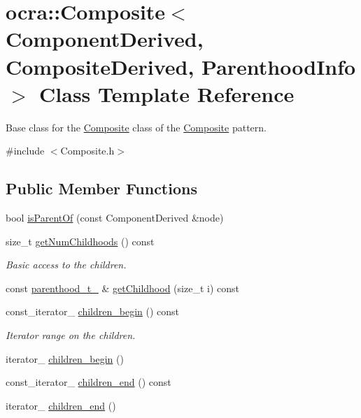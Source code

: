 \hypertarget{classocra_1_1Composite}{}\section{ocra\+:\+:Composite$<$ Component\+Derived, Composite\+Derived, Parenthood\+Info $>$ Class Template Reference}
\label{classocra_1_1Composite}


Base class for the \hyperlink{classocra_1_1Composite}{Composite} class of the \hyperlink{classocra_1_1Composite}{Composite} pattern.  




{\ttfamily \#include $<$Composite.\+h$>$}

\subsection*{Public Member Functions}
\begin{DoxyCompactItemize}
\item 
bool \hyperlink{classocra_1_1Composite_a7d241ce8b7c6410c021a9314773fe7d3}{is\+Parent\+Of} (const Component\+Derived \&node)
\end{DoxyCompactItemize}
{\bf }\par
\begin{DoxyCompactItemize}
\item 
size\+\_\+t \hyperlink{classocra_1_1Composite_a98b9c61d23328a34cdc44e2fef04c056}{get\+Num\+Childhoods} () const 
\begin{DoxyCompactList}\small\item\em Basic access to the children. \end{DoxyCompactList}\item 
const \hyperlink{classocra_1_1Parenthood}{parenthood\+\_\+t\+\_\+} \& \hyperlink{classocra_1_1Composite_acb039d2d3b21894d813f58009fea2d99}{get\+Childhood} (size\+\_\+t i) const 
\end{DoxyCompactItemize}

{\bf }\par
\begin{DoxyCompactItemize}
\item 
const\+\_\+iterator\+\_\+ \hyperlink{classocra_1_1Composite_a600454e7d4d5ca0eec5c60abb9119061}{children\+\_\+begin} () const 
\begin{DoxyCompactList}\small\item\em Iterator range on the children. \end{DoxyCompactList}\item 
iterator\+\_\+ \hyperlink{classocra_1_1Composite_ab5ec766141bb1d85ad8c32fdafe5e041}{children\+\_\+begin} ()
\item 
const\+\_\+iterator\+\_\+ \hyperlink{classocra_1_1Composite_a88679e523838bfb0bae219b4252d27eb}{children\+\_\+end} () const 
\item 
iterator\+\_\+ \hyperlink{classocra_1_1Composite_aea1639d5f852f80eb12266dcbb730a3b}{children\+\_\+end} ()
\end{DoxyCompactItemize}


